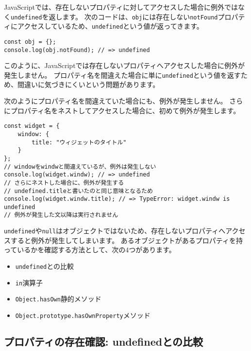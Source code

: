 JavaScriptでは、存在しないプロパティに対してアクセスした場合に例外ではなく\texttt{undefined}を返します。
次のコードは、\texttt{obj}には存在しない\texttt{notFound}プロパティにアクセスしているため、\texttt{undefined}という値が返ってきます。

\begin{lstlisting}
const obj = {};
console.log(obj.notFound); // => undefined
\end{lstlisting}

このように、JavaScriptでは存在しないプロパティへアクセスした場合に例外が発生しません。
プロパティ名を間違えた場合に単に\texttt{undefined}という値を返すため、間違いに気づきにくいという問題があります。

次のようにプロパティ名を間違えていた場合にも、例外が発生しません。
さらにプロパティ名をネストしてアクセスした場合に、初めて例外が発生します。

\begin{lstlisting}
const widget = {
    window: {
        title: "ウィジェットのタイトル"
    }
};
// windowをwindwと間違えているが、例外は発生しない
console.log(widget.windw); // => undefined
// さらにネストした場合に、例外が発生する
// undefined.titleと書いたのと同じ意味となるため
console.log(widget.windw.title); // => TypeError: widget.windw is undefined
// 例外が発生した文以降は実行されません
\end{lstlisting}

\enlargethispage{\baselineskip}\enlargethispage{\baselineskip}\texttt{undefined}や\texttt{null}はオブジェクトではないため、存在しないプロパティへアクセスすると例外が発生してしまいます。
あるオブジェクトがあるプロパティを持っているかを確認する方法として、次の4つがあります。

\begin{itemize}
\item
  \texttt{undefined}との比較
\item
  \texttt{in}演算子
\item
  \texttt{Object.hasOwn}静的メソッド\,\protect{}
\item
  \texttt{Object.prototype.hasOwnProperty}メソッド
\end{itemize}

\hypertarget{compare-to-undefined}{%
\subsection{プロパティの存在確認:
undefinedとの比較}\label{compare-to-undefined}}

